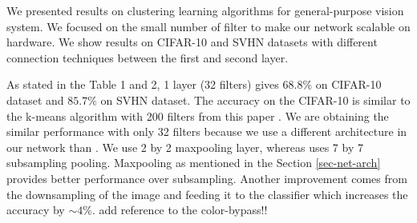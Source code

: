 \documentclass{article} %
\begin{document}





We presented results on clustering learning algorithms for general-purpose vision system. We focused on the small number of filter to make our network scalable on hardware. We show results on CIFAR-10 and SVHN datasets with different connection techniques between the first and second layer. 

As stated in the Table 1 and 2, 1 layer (32 filters) gives $68.8\%$ on CIFAR-10 dataset and  $85.7\%$ on SVHN dataset.  The accuracy on the CIFAR-10 is similar to the k-means algorithm with 200 filters from this paper
\cite{coates_analysis_2011}. We are obtaining the similar performance with only 32 filters because we use a different architecture in our network than \cite{coates_analysis_2011}. We use 2 by 2 maxpooling layer, whereas \cite{coates_analysis_2011} uses 7 by 7 subsampling pooling. Maxpooling as mentioned in the Section \ref{sec-net-arch} provides better performance over subsampling. Another improvement comes from the downsampling of the image and feeding it to the classifier which increases the accuracy by  $\sim 4\%$. add reference to the color-bypass!!
\end{document}
